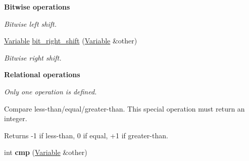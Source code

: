\begin{Indent}{\bf Bitwise operations}
\begin{DoxyCompactItemize}
\begin{DoxyCompactList}\small\item\em Bitwise left shift. \end{DoxyCompactList}\item 
\hyperlink{classcreek_1_1_variable}{Variable} \hyperlink{classcreek_1_1_variable_a0afe711deb1862c9fa82b836bc8e895b}{bit\+\_\+right\+\_\+shift} (\hyperlink{classcreek_1_1_variable}{Variable} \&other)\hypertarget{classcreek_1_1_variable_a0afe711deb1862c9fa82b836bc8e895b}{}\label{classcreek_1_1_variable_a0afe711deb1862c9fa82b836bc8e895b}

\begin{DoxyCompactList}\small\item\em Bitwise right shift. \end{DoxyCompactList}\end{DoxyCompactItemize}
\end{Indent}
\begin{Indent}{\bf Relational operations}\par
{\em Only one operation is defined.

Compare less-\/than/equal/greater-\/than. This special operation must return an integer. \begin{DoxyReturn}{Returns}
-\/1 if less-\/than, 0 if equal, +1 if greater-\/than. 
\end{DoxyReturn}
}\begin{DoxyCompactItemize}
\item 
int {\bfseries cmp} (\hyperlink{classcreek_1_1_variable}{Variable} \&other)\hypertarget{classcreek_1_1_variable_ada657df06abbf0776a36ba7e15201a65}{}\label{classcreek_1_1_variable_ada657df06abbf0776a36ba7e15201a65}

\end{DoxyCompactItemize}
\end{Indent}
